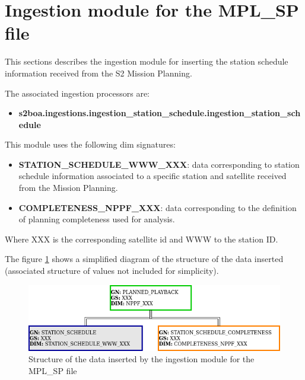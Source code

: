 \section{Ingestion module for the MPL\_SP file}

This sections describes the ingestion module for inserting the station schedule information received from the S2 Mission Planning.

The associated ingestion processors are:

\begin{itemize} 

\item \textbf{s2boa.ingestions.ingestion\_station\_schedule.ingestion\_station\_schedule}
  
\end{itemize}

This module uses the following \acrshort{dim} signatures:

\begin{itemize} 

\item \textbf{STATION\_SCHEDULE\_WWW\_XXX}: data corresponding to station schedule information associated to a specific station and satellite received from the Mission Planning.

\item \textbf{COMPLETENESS\_NPPF\_XXX}: data corresponding to the definition of planning completeness used for analysis.
  
\end{itemize}

Where XXX is the corresponding satellite id and WWW to the station ID.

The figure \ref{fg:structure_ingestion_station_schedule} shows a simplified diagram of the structure of the data inserted (associated structure of values not included for simplicity).

\begin{figure}[H]
  \begin{center}
	\centering\includegraphics[width=150mm]{../fig/structure_ingestion_station_schedule.png}
	\caption{Structure of the data inserted by the ingestion module for the MPL\_SP file}
	\label{fg:structure_ingestion_station_schedule}
  \end{center}
\end{figure}

